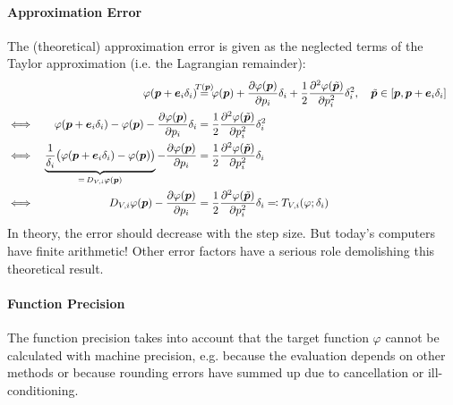 				\paragraph{Approximation Error}
					The (theoretical) approximation error is given as the neglected terms of the Taylor approximation (i.e. the Lagrangian remainder):
					\begin{align*}
						&& \varphi(\vec{p} + \vec{e}_i \delta_i) &\overset{\mathclap{\,T(\vec{p})\,}}{=} \varphi(\vec{p}) + \pdv{\varphi(\vec{p})}{p_i} \delta_i + \frac{1}{2} \pdv[2]{\varphi(\tilde{\vec{p}})}{p_i} \delta_i^2,\quad \tilde{\vec{p}} \in [\vec{p}, \vec{p} + \vec{e}_i \delta_i] & \\
						\iff && \varphi(\vec{p} + \vec{e}_i \delta_i) - \varphi(\vec{p}) - \pdv{\varphi(\vec{p})}{p_i} \delta_i &= \frac{1}{2} \pdv[2]{\varphi(\tilde{\vec{p}})}{p_i} \delta_i^2 & \\
						\iff && \underbrace{\frac{1}{\delta_i} \big( \varphi(\vec{p} + \vec{e}_i \delta_i) - \varphi(\vec{p}) \big)}_{=\, D_{V, i}\varphi(\vec{p})} - \pdv{\varphi(\vec{p})}{p_i} &= \frac{1}{2} \pdv[2]{\varphi(\tilde{\vec{p}})}{p_i} \delta_i & \\
						\iff && D_{V, i}\varphi(\vec{p}) - \pdv{\varphi(\vec{p})}{p_i} &= \frac{1}{2} \pdv[2]{\varphi(\tilde{\vec{p}})}{p_i} \delta_i \eqqcolon T_{V, i}(\varphi; \delta_i) &
					\end{align*}
					In theory, the error should decrease with the step size. But today's computers have finite arithmetic! Other error factors have a serious role demolishing this theoretical result.

				\paragraph{Function Precision}
					The function precision takes into account that the target function \( \varphi \) cannot be calculated with machine precision, e.g. because the evaluation depends on other methods or because rounding errors have summed up due to cancellation or ill-conditioning.

